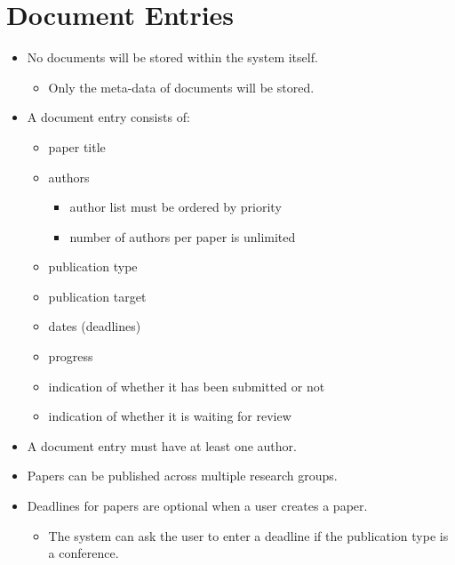 \documentclass{article}
\begin{document}
\section{Document Entries}\label{sec:docs}
	\begin{itemize}
		\item No documents will be stored within the system itself.
		\begin{itemize}
			\item Only the meta-data of documents will be stored.
		\end{itemize}
		\item A document entry consists of:
		\begin{itemize}
			\item paper title
			\item authors
			\begin{itemize}
				\item author list must be ordered by priority
				\item number of authors per paper is unlimited
			\end{itemize}
			\item publication type
			\item publication target
			\item dates (deadlines)
			\item progress
			\item indication of whether it has been submitted or not
			\item indication of whether it is waiting for review
		\end{itemize}
		\item A document entry must have at least one author.
		\item Papers can be published across multiple research groups.
		\item Deadlines for papers are optional when a user creates a paper.
			\begin{itemize}
				\item The system can ask the user to enter a deadline if the publication type is a conference.
			\end{itemize}
	\end{itemize}
	
\end{document}
